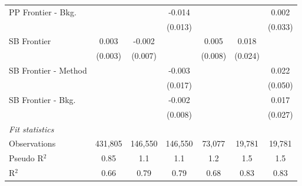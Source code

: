 \begin{tabular}{lcccccc}
   PP Frontier - Bkg.   &                &                & -0.014         &                &              & 0.002\\   
                        &                &                & (0.013)        &                &              & (0.033)\\   
   SB Frontier          & 0.003          & -0.002         &                & 0.005          & 0.018        &   \\   
                        & (0.003)        & (0.007)        &                & (0.008)        & (0.024)      &   \\   
   SB Frontier - Method &                &                & -0.003         &                &              & 0.022\\   
                        &                &                & (0.017)        &                &              & (0.050)\\   
   SB Frontier - Bkg.   &                &                & -0.002         &                &              & 0.017\\   
                        &                &                & (0.008)        &                &              & (0.027)\\   
   \midrule
   \emph{Fit statistics}\\
   Observations         & 431,805        & 146,550        & 146,550        & 73,077         & 19,781       & 19,781\\  
   Pseudo R$^2$         & 0.85           & 1.1            & 1.1            & 1.2            & 1.5          & 1.5\\  
   R$^2$                & 0.66           & 0.79           & 0.79           & 0.68           & 0.83         & 0.83\\  
   

\end{tabular}
